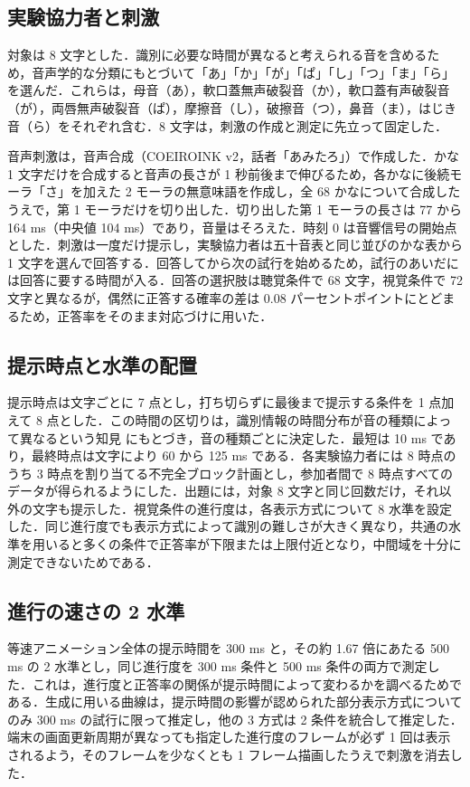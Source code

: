 \subsection{実験協力者と刺激}

対象は 8 文字とした．識別に必要な時間が異なると考えられる音を含めるため，音声学的な分類にもとづいて「あ」「か」「が」「ぱ」「し」「つ」「ま」「ら」を選んだ．これらは，母音（あ），軟口蓋無声破裂音（か），軟口蓋有声破裂音（が），両唇無声破裂音（ぱ），摩擦音（し），破擦音（つ），鼻音（ま），はじき音（ら）をそれぞれ含む．8 文字は，刺激の作成と測定に先立って固定した．

音声刺激は，音声合成（COEIROINK v2，話者「あみたろ」）で作成した．かな 1 文字だけを合成すると音声の長さが 1 秒前後まで伸びるため，各かなに後続モーラ「さ」を加えた 2 モーラの無意味語を作成し，全 68 かなについて合成したうえで，第 1 モーラだけを切り出した．切り出した第 1 モーラの長さは 77 から 164 ms（中央値 104 ms）であり，音量はそろえた．時刻 0 は音響信号の開始点とした．刺激は一度だけ提示し，実験協力者は五十音表と同じ並びのかな表から 1 文字を選んで回答する．回答してから次の試行を始めるため，試行のあいだには回答に要する時間が入る．回答の選択肢は聴覚条件で 68 文字，視覚条件で 72 文字と異なるが，偶然に正答する確率の差は 0.08 パーセントポイントにとどまるため，正答率をそのまま対応づけに用いた．


\subsection{提示時点と水準の配置}

提示時点は文字ごとに 7 点とし，打ち切らずに最後まで提示する条件を 1 点加えて 8 点とした．この時間の区切りは，識別情報の時間分布が音の種類によって異なるという知見 \cite{furui,smits} にもとづき，音の種類ごとに決定した．最短は 10 ms であり，最終時点は文字により 60 から 125 ms である．各実験協力者には 8 時点のうち 3 時点を割り当てる不完全ブロック計画とし，参加者間で 8 時点すべてのデータが得られるようにした．出題には，対象 8 文字と同じ回数だけ，それ以外の文字も提示した．視覚条件の進行度は，各表示方式について 8 水準を設定した．同じ進行度でも表示方式によって識別の難しさが大きく異なり，共通の水準を用いると多くの条件で正答率が下限または上限付近となり，中間域を十分に測定できないためである．


\subsection{進行の速さの 2 水準}

等速アニメーション全体の提示時間を 300 ms と，その約 1.67 倍にあたる 500 ms の 2 水準とし，同じ進行度を 300 ms 条件と 500 ms 条件の両方で測定した．これは，進行度と正答率の関係が提示時間によって変わるかを調べるためである．生成に用いる曲線は，提示時間の影響が認められた部分表示方式についてのみ 300 ms の試行に限って推定し，他の 3 方式は 2 条件を統合して推定した．端末の画面更新周期が異なっても指定した進行度のフレームが必ず 1 回は表示されるよう，そのフレームを少なくとも 1 フレーム描画したうえで刺激を消去した．


